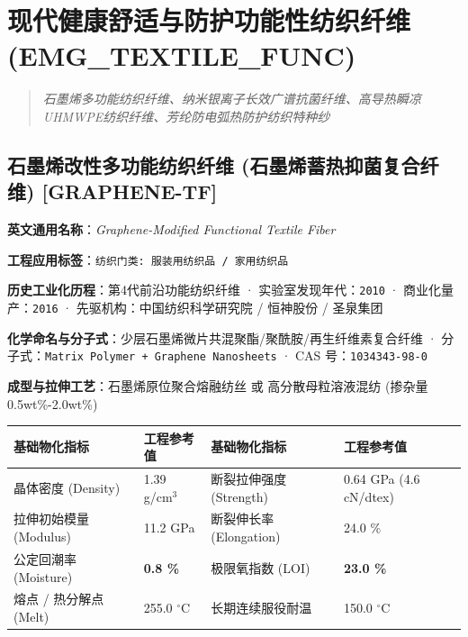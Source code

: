 \documentclass[11pt,openright,twoside,UTF8]{ctexbook}
\begin{document}
\chapter{现代健康舒适与防护功能性纺织纤维 (EMG\_TEXTILE\_FUNC)}
\begin{quote}
\small\itshape
石墨烯多功能纺织纤维、纳米银离子长效广谱抗菌纤维、高导热瞬凉UHMWPE纺织纤维、芳纶防电弧热防护纺织特种纱
\end{quote}

\section{石墨烯改性多功能纺织纤维 (石墨烯蓄热抑菌复合纤维) [GRAPHENE-TF]}
\label{sec:graphene-tf}

\noindent\textbf{英文通用名称}：\textit{Graphene-Modified Functional Textile Fiber}\par
\noindent\textbf{工程应用标签}：\texttt{纺织门类: 服装用纺织品 / 家用纺织品}\par
\noindent\textbf{历史工业化历程}：第4代前沿功能纺织纤维 · 实验室发现年代：\texttt{2010} · 商业化量产：\texttt{2016} · 先驱机构：中国纺织科学研究院 / 恒神股份 / 圣泉集团\par
\noindent\textbf{化学命名与分子式}：少层石墨烯微片共混聚酯/聚酰胺/再生纤维素复合纤维 · 分子式：\texttt{Matrix Polymer + Graphene Nanosheets} · CAS 号：\texttt{1034343-98-0}\par
\noindent\textbf{成型与拉伸工艺}：石墨烯原位聚合熔融纺丝 或 高分散母粒溶液混纺 (掺杂量 0.5wt\%-2.0wt\%)\par

\vspace{0.15cm}
\begin{center}
\small
\begin{tabularx}{\textwidth}{p{3.8cm}Xp{3.8cm}X}
\toprule
\textbf{基础物化指标} & \textbf{工程参考值} & \textbf{基础物化指标} & \textbf{工程参考值} \\
\midrule
晶体密度 (Density) & 1.39 g/cm$^3$ & 断裂拉伸强度 (Strength) & 0.64 GPa (4.6 cN/dtex) \\
拉伸初始模量 (Modulus) & 11.2 GPa & 断裂伸长率 (Elongation) & 24.0 \% \\
公定回潮率 (Moisture) & \textbf{0.8 \%} & 极限氧指数 (LOI) & \textbf{23.0 \%} \\
熔点 / 热分解点 (Melt) & 255.0 $^\circ\mathrm{C}$ & 长期连续服役耐温 & 150.0 $^\circ\mathrm{C}$ \\
\bottomrule
\end{tabularx}
\end{center}
\vspace{0.15cm}
\end{document}
